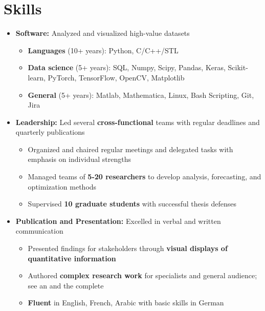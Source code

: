 \documentclass{myfancycv}
\begin{document}
\section{Skills}
\begin{itemize}

\item {\textbf{Software:} Analyzed and visualized high-value datasets
{\begin{itemize}\setlength\itemindent{-2.2em}
\item {\bf Languages} (10+ years): Python, C/C++/STL
\item {\bf Data science} (5+ years): SQL, Numpy, Scipy, Pandas, Keras, Scikit-learn, PyTorch, TensorFlow, OpenCV, Matplotlib
\item {\bf General} (5+ years): Matlab, Mathematica, Linux, Bash Scripting, Git, Jira
\end{itemize}
}
}

\vspace{6pt}

\item {\textbf{Leadership:} Led several {\bf cross-functional} teams with regular deadlines and quarterly publications
{\begin{itemize}\setlength\itemindent{-2.2em}
    \item Organized and chaired regular meetings and delegated tasks with emphasis on individual strengths
    \item Managed teams of {\bf 5-20 researchers} to develop analysis, forecasting, and optimization methods
    \item Supervised {\bf10 graduate students} with successful thesis defenses
\end{itemize}}%
}

\vspace{6pt}

\item{ \textbf{Publication and Presentation:} Excelled in verbal and written communication
{\begin{itemize}\setlength\itemindent{-2.2em}
\item Presented findings for stakeholders through {\bf visual displays of quantitative information}
\item Authored {\bf complex research work} for specialists and general audience; see an \href{http://atlas.cern/updates/physics-briefing/probing-dark-matter-higgs-boson}{} and the complete  \href{https://orcid.org/0000-0002-9169-0793}{}
\item {\bf Fluent} in English, French, Arabic with basic skills in German

\end{itemize}}%
}


\end{itemize}
\end{document}
